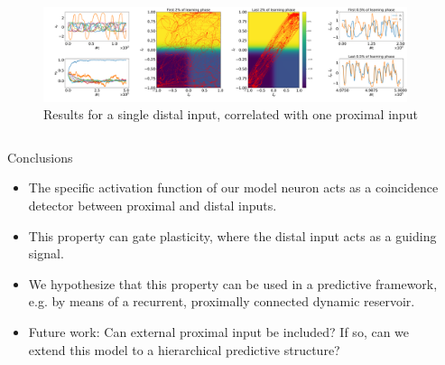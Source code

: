 \documentclass{beamer}
\begin{document}
\begin{frame}[t]
\begin{columns}[t]
\begin{column}{.5\textwidth}
\end{column}
\end{columns}

\begin{figure}
\centering
\includegraphics[width=0.95\textwidth]{../figures/fig2.pdf}
\caption{Results for a single distal input, correlated with one proximal input}
\label{fig:Results_1}
\end{figure}

\begin{columns}[t]
\begin{column}{.4\textwidth}
\vspace{-1.83\baselineskip}
\begin{myblock}{Conclusions}
\begin{itemize}
\item The specific activation function of our model neuron acts as a coincidence detector between proximal and distal inputs.
\item This property can gate plasticity, where the distal input acts as a guiding signal.
\item We hypothesize that this property can be used in a predictive framework, e.g. by means of a recurrent, proximally connected dynamic reservoir.
\item Future work: Can external proximal input be included? If so, can we extend this model to a hierarchical predictive structure?
\end{itemize}
\end{myblock}
\end{column}
\begin{column}{.5\textwidth}
\noindent\rule{\textwidth}{2px}
\begin{footnotesize}


\end{footnotesize}
\end{column}
\end{columns}

\end{frame}
\end{document}
